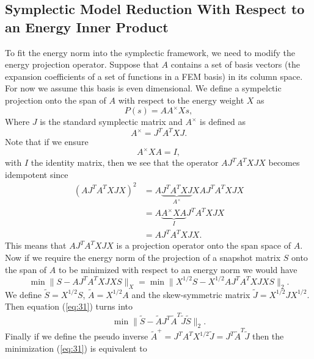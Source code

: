 \documentclass[12pt]{article}
\begin{document}
\subsection{Symplectic Model Reduction With Respect to an Energy Inner Product}
To fit the energy norm into the symplectic framework, we need to modify the energy projection operator. Suppose that $A$ contains a set of basis vectors (the expansion coefficients of a set of functions in a FEM basis) in its column space. For now we assume this basis is even dimensional. We define a sympelctic projection onto the span of $A$ with respect to the energy weight $X$ as
\begin{equation} \label{eq:28}
	P(s) = AA^\times Xs,
\end{equation}
Where $J$ is the standard symplectic matrix and $A^\times$ is defined as
\begin{equation} \label{eq:29}
	A^\times = J^T A^T X J.
\end{equation}
Note that if we ensure
\begin{equation} \label{eq:30}
	A^\times XA=I,
\end{equation}
with $I$ the identity matrix, then we see that the operator $AJ^TA^TXJX$ becomes idempotent since
\begin{equation} \label{eq:31}
\begin{aligned}
	(AJ^TA^TXJX)^2 &= A\underbrace{J^TA^TXJ}_{A^\times}XAJ^TA^TXJX \\
	&= A\underbrace{A^\times XA}_{I}J^TA^TXJX\\
       	&= AJ^TA^TXJX.
\end{aligned}
\end{equation}
This means that $AJ^TA^TXJX$ is a projection operator onto the span space of $A$. Now if we require the energy norm of the projection of a snapshot matrix $S$ onto the span of $A$ to be minimized with respect to an energy norm we would have
\begin{equation} \label{eq:32}
	\min \| S - AJ^TA^TXJX S \|_X = \min \| X^{1/2} S - X^{1/2} AJ^TA^TXJX S \|_2.
\end{equation}
We define $\tilde S = X^{1/2}S$, $\tilde A = X^{1/2} A$ and the skew-symmetric matrix $\tilde J = X^{1/2} J X^{1/2}$. Then equation (\ref{eq:31}) turns into
\begin{equation} \label{eq:33}
	\min \| \tilde S - \tilde A J^T {\tilde A}^T \tilde J \tilde S\|_2.
\end{equation}
Finally if we define the pseudo inverse ${\tilde A }^+ = J^T A^T X^{1/2} \tilde J = J^T {\tilde A}^T \tilde J$ then the minimization (\ref{eq:31}) is equivalent to
\end{document}
